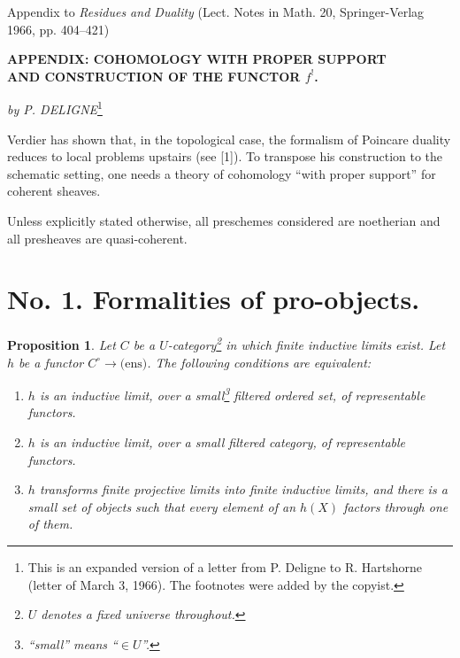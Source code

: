 \documentclass[12pt]{amsart}
\theoremstyle{plain}
\newtheorem{prop}{Proposition}
\theoremstyle{definition}
\begin{document}
\begin{center}
Appendix to \textit{Residues and Duality} (Lect. Notes in Math. 20, Springer-Verlag 1966, pp. 404--421)
\end{center}

\bigskip

\begin{center}
\textbf{APPENDIX: COHOMOLOGY WITH PROPER SUPPORT}\\[4pt]
\textbf{AND CONSTRUCTION OF THE FUNCTOR $f^{!}$.}
\end{center}

\medskip

\begin{center}
\textit{by P. DELIGNE}\footnote{This is an expanded version of a letter from P. Deligne to R. Hartshorne (letter of March 3, 1966). The footnotes were added by the copyist.}
\end{center}

\bigskip

Verdier has shown that, in the topological case, the formalism of Poincare duality reduces to local problems upstairs (see [1]). To transpose his construction to the schematic setting, one needs a theory of cohomology ``with proper support'' for coherent sheaves.

Unless explicitly stated otherwise, all preschemes considered are noetherian and all presheaves are quasi-coherent.

\section*{No. 1. Formalities of pro-objects.}

\begin{prop}
Let $C$ be a $U$-category\footnote{$U$ denotes a fixed universe throughout.} in which finite inductive limits exist. Let $h$ be a functor $C^{\circ}\to\text{(ens)}$. The following conditions are equivalent:
\begin{enumerate}
\item[(i)] $h$ is an inductive limit, over a small\footnote{``small'' means ``$\in U$''.} filtered ordered set, of representable functors.
\item[(ii)] $h$ is an inductive limit, over a small filtered category, of representable functors.
\item[(iii)] $h$ transforms finite projective limits into finite inductive limits, and there is a small set of objects such that every element of an $h(X)$ factors through one of them.
\end{enumerate}
\end{prop}
\end{document}
